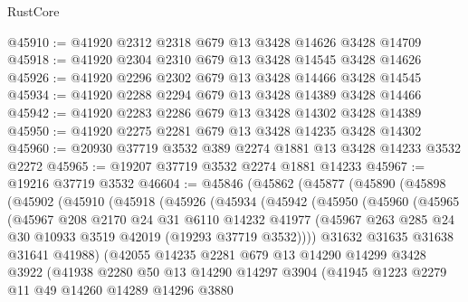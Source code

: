\begin{lexlean}{RustCore}
\begin{coremodule}
@45910 := @41920 @2312 @2318 @679 @13 @3428 @14626 @3428 @14709
@45918 := @41920 @2304 @2310 @679 @13 @3428 @14545 @3428 @14626
@45926 := @41920 @2296 @2302 @679 @13 @3428 @14466 @3428 @14545
@45934 := @41920 @2288 @2294 @679 @13 @3428 @14389 @3428 @14466
@45942 := @41920 @2283 @2286 @679 @13 @3428 @14302 @3428 @14389
@45950 := @41920 @2275 @2281 @679 @13 @3428 @14235 @3428 @14302
@45960 := @20930 @37719 @3532 @389 @2274 @1881 @13 @3428 @14233 @3532 @2272
@45965 := @19207 @37719 @3532 @2274 @1881 @14233
@45967 := @19216 @37719 @3532
@46604 := @45846
    (@45862
      (@45877
        (@45890
          (@45898
            (@45902
              (@45910
                (@45918
                  (@45926
                    (@45934
                      (@45942
                        (@45950
                          (@45960
                            (@45965
                              (@45967
                                @208
                                @2170
                                @24
                                @31
                                @6110
                                @14232
                                @41977
                                (@45967
                                  @263
                                  @285
                                  @24
                                  @30
                                  @10933
                                  @3519
                                  @42019
                                  (@19293 @37719 @3532))))
                            @31632
                            @31635
                            @31638
                            @31641
                            @41988)
                          (@42055
                            @14235
                            @2281
                            @679
                            @13
                            @14290
                            @14299
                            @3428
                            @3922
                            (@41938
                              @2280
                              @50
                              @13
                              @14290
                              @14297
                              @3904
                              (@41945
                                @1223
                                @2279
                                @11
                                @49
                                @14260
                                @14289
                                @14296
                                @3880

\end{coremodule}
\end{lexlean}
